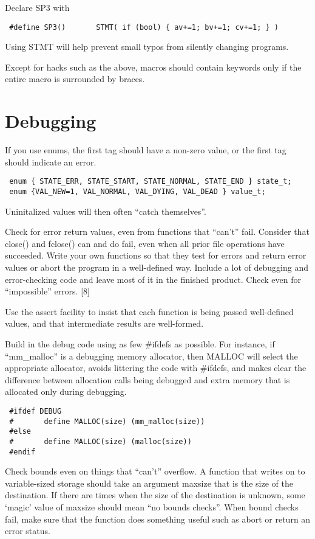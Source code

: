 Declare SP3 with 

\begin{verbatim}
 #define SP3()       STMT( if (bool) { av+=1; bv+=1; cv+=1; } )
\end{verbatim}

Using STMT will help prevent small typos from silently changing programs. 

Except for hacks such as the above, macros should contain keywords
only if the entire macro is surrounded by braces. 
\newpage
\section{Debugging}

 If you use enums, the first tag should have a non-zero value, or the first tag
should indicate an error. 
\begin{verbatim}
 enum { STATE_ERR, STATE_START, STATE_NORMAL, STATE_END } state_t;
 enum {VAL_NEW=1, VAL_NORMAL, VAL_DYING, VAL_DEAD } value_t; 
\end{verbatim}
Uninitalized values will then often ``catch themselves''. 

 Check for error return values, even from functions that ``can't'' fail.
Consider that close() and fclose() can and do fail, even when all prior file
operations have succeeded. Write your own functions so that they test for
errors and return error values or abort the program in a well-defined way.
Include a lot of debugging and error-checking code and leave most of it in 
the finished product. Check even for ``impossible'' errors. [8] 

 Use the assert facility to insist that each function is being passed
well-defined values, and that intermediate results are well-formed. 

 Build in the debug code using as few \#ifdefs as possible. For instance, if
``mm\_malloc'' is a debugging memory allocator, then MALLOC will select the
appropriate allocator, avoids littering the code with \#ifdefs, and makes clear
the difference between allocation calls being debugged and extra memory that is
allocated only during debugging. 

\begin{verbatim}
 #ifdef DEBUG
 #       define MALLOC(size) (mm_malloc(size))
 #else
 #       define MALLOC(size) (malloc(size))
 #endif
\end{verbatim}

 Check bounds even on things that ``can't'' overflow. A function that writes on
to variable-sized storage should take an argument maxsize that is the size of
the destination. If there are times when the size of the destination is
unknown, some `magic' value of maxsize should mean ``no bounds checks''. When
bound checks fail, make sure that the function does something useful such as
abort or return an error status. 

